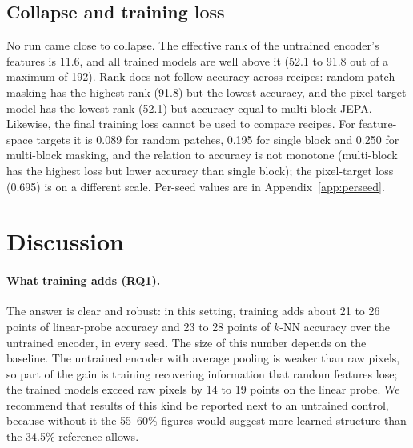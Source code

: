 \documentclass[pdflatex,sn-basic]{sn-jnl}%
\begin{document}
\subsection{Collapse and training loss}\label{sec:res-diag}
No run came close to collapse. The effective rank of the untrained encoder's features is 11.6, and all trained models are well above it (52.1 to 91.8 out of a maximum of 192). Rank does not follow accuracy across recipes: random-patch masking has the highest rank (91.8) but the lowest accuracy, and the pixel-target model has the lowest rank (52.1) but accuracy equal to multi-block JEPA. Likewise, the final training loss cannot be used to compare recipes. For feature-space targets it is 0.089 for random patches, 0.195 for single block and 0.250 for multi-block masking, and the relation to accuracy is not monotone (multi-block has the highest loss but lower accuracy than single block); the pixel-target loss (0.695) is on a different scale. Per-seed values are in Appendix~\ref{app:perseed}.

\section{Discussion}\label{sec:discussion}

\paragraph{What training adds (RQ1).}
The answer is clear and robust: in this setting, training adds about 21 to 26 points of linear-probe accuracy and 23 to 28 points of $k$-NN accuracy over the untrained encoder, in every seed. The size of this number depends on the baseline. The untrained encoder with average pooling is weaker than raw pixels, so part of the gain is training recovering information that random features lose; the trained models exceed raw pixels by 14 to 19 points on the linear probe. We recommend that results of this kind be reported next to an untrained control, because without it the 55--60\% figures would suggest more learned structure than the 34.5\% reference allows.
\end{document}
